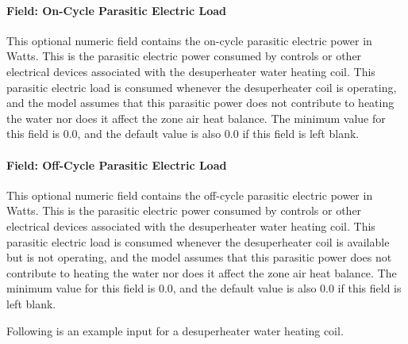 \paragraph{Field: On-Cycle Parasitic Electric Load}\label{field-on-cycle-parasitic-electric-load}

This optional numeric field contains the on-cycle parasitic electric power in Watts. This is the parasitic electric power consumed by controls or other electrical devices associated with the desuperheater water heating coil. This parasitic electric load is consumed whenever the desuperheater coil is operating, and the model assumes that this parasitic power does not contribute to heating the water nor does it affect the zone air heat balance. The minimum value for this field is 0.0, and the default value is also 0.0 if this field is left blank.

\paragraph{Field: Off-Cycle Parasitic Electric Load}\label{field-off-cycle-parasitic-electric-load}

This optional numeric field contains the off-cycle parasitic electric power in Watts. This is the parasitic electric power consumed by controls or other electrical devices associated with the desuperheater water heating coil. This parasitic electric load is consumed whenever the desuperheater coil is available but is not operating, and the model assumes that this parasitic power does not contribute to heating the water nor does it affect the zone air heat balance. The minimum value for this field is 0.0, and the default value is also 0.0 if this field is left blank.

Following is an example input for a desuperheater water heating coil.

